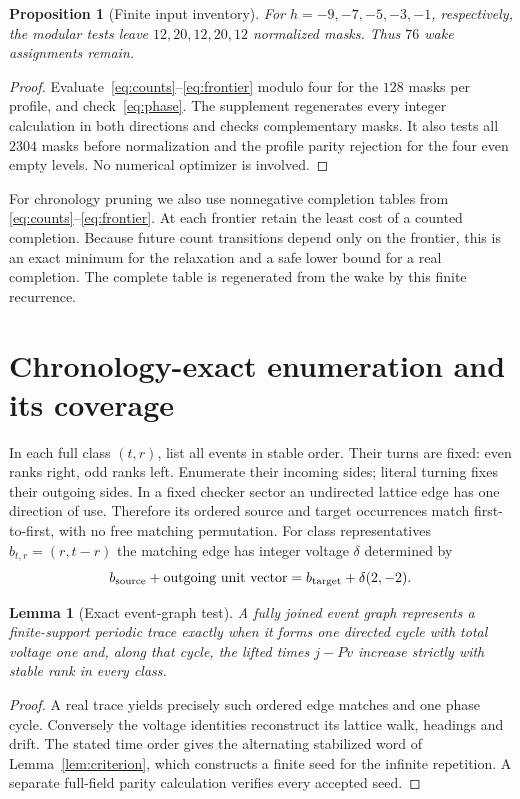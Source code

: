 \documentclass[11pt]{article}
\newtheorem{lemma}[theorem]{Lemma}
\newtheorem{proposition}[theorem]{Proposition}
\theoremstyle{definition}\newtheorem{definition}[theorem]{Definition}
\begin{document}
\begin{proposition}[Finite input inventory]\label{prop:inventory}
For $h=-9,-7,-5,-3,-1$, respectively, the modular tests leave
$12,20,12,20,12$ normalized masks. Thus $76$ wake assignments remain.
\end{proposition}
\begin{proof}
Evaluate~\eqref{eq:counts}--\eqref{eq:frontier} modulo four for the $128$ masks
per profile, and check~\eqref{eq:phase}. The supplement regenerates every
integer calculation in both directions and checks complementary masks.
It also tests all $2304$ masks before normalization and the profile parity
rejection for the four even empty levels. No numerical optimizer is involved.
\end{proof}

For chronology pruning we also use nonnegative completion tables from
\eqref{eq:counts}--\eqref{eq:frontier}. At each frontier retain the least cost
of a counted completion. Because future count transitions depend only on the
frontier, this is an exact minimum for the relaxation and a safe lower bound
for a real completion. The complete table is regenerated from the wake by this finite recurrence.

\section{Chronology-exact enumeration and its coverage}
In each full class $(t,r)$, list all events in stable order. Their turns are
fixed: even ranks right, odd ranks left. Enumerate their incoming sides;
literal turning fixes their outgoing sides. In a fixed checker sector an
undirected lattice edge has one direction of use. Therefore its ordered source
and target occurrences match first-to-first, with no free matching permutation.
For class representatives $b_{t,r}=(r,t-r)$ the matching edge has integer voltage
$\delta$ determined by
\[
b_{\rm source}+\text{outgoing unit vector}
=b_{\rm target}+\delta(2,-2).
\]

\begin{lemma}[Exact event-graph test]\label{lem:graph}
A fully joined event graph represents a finite-support periodic trace exactly
when it forms one directed cycle with total voltage one and, along that cycle,
the lifted times $j-Pv$ increase strictly with stable rank in every class.
\end{lemma}
\begin{proof}
A real trace yields precisely such ordered edge matches and one phase cycle.
Conversely the voltage identities reconstruct its lattice walk, headings and
drift. The stated time order gives the alternating stabilized word of
Lemma~\ref{lem:criterion}, which constructs a finite seed for the infinite
repetition. A separate full-field parity calculation verifies every accepted seed.
\end{proof}
\end{document}

